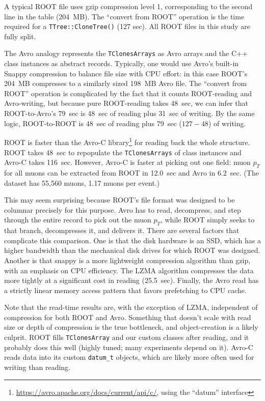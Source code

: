 \documentclass{article}
\begin{document}
A typical ROOT file uses gzip compression level 1, corresponding to the second line in the table (204~MB). The ``convert from ROOT'' operation is the time required for a {\tt TTree::CloneTree()} (127 sec). All ROOT files in this study are fully split.

The Avro analogy represents the {\tt TClonesArrays} as Avro arrays and the C++ class instances as abstract records. Typically, one would use Avro's built-in Snappy compression to balance file size with CPU effort: in this case ROOT's 204~MB compresses to a similarly sized 198~MB Avro file. The ``convert from ROOT'' operation is complicated by the fact that it counts ROOT-reading and Avro-writing, but because pure ROOT-reading takes 48~sec, we can infer that ROOT-to-Avro's 79~sec is 48~sec of reading plus 31~sec of writing. By the same logic, ROOT-to-ROOT is 48~sec of reading plus 79~sec ($127 - 48$) of writing.

ROOT is faster than the Avro-C library\footnote{\url{https://avro.apache.org/docs/current/api/c/}, using the ``datum'' interface} for reading back the whole structure. ROOT takes 48~sec to repopulate the {\tt TClonesArrays} of class instances and Avro-C takes 116~sec. However, Avro-C is faster at picking out one field: muon $p_T$ for all muons can be extracted from ROOT in 12.0~sec and Avro in 6.2~sec. (The dataset has 55,560 muons, 1.17 muons per event.)

This may seem surprising because ROOT's file format was designed to be columnar precisely for this purpose. Avro has to read, decompress, and step through the entire record to pick out the muon $p_T$, while ROOT simply seeks to that branch, decompresses it, and delivers it. There are several factors that complicate this comparison. One is that the disk hardware is an SSD, which has a higher bandwidth than the mechanical disk drives for which ROOT was designed. Another is that snappy is a more lightweight compression algorithm than gzip, with an emphasis on CPU efficiency. The LZMA algorithm compresses the data more tightly at a significant cost in reading (25.5~sec). Finally, the Avro read has a strictly linear memory access pattern that favors prefetching to CPU cache.

Note that the read-time results are, with the exception of LZMA, independent of compression for both ROOT and Avro. Something that doesn't scale with read size or depth of compression is the true bottleneck, and object-creation is a likely culprit. ROOT fills {\tt TClonesArray} and our custom classes after reading, and it probably does this well (highly tuned; many experiments depend on it). Avro-C reads data into its custom {\tt datum\_t} objects, which are likely more often used for writing than reading.
\end{document}
